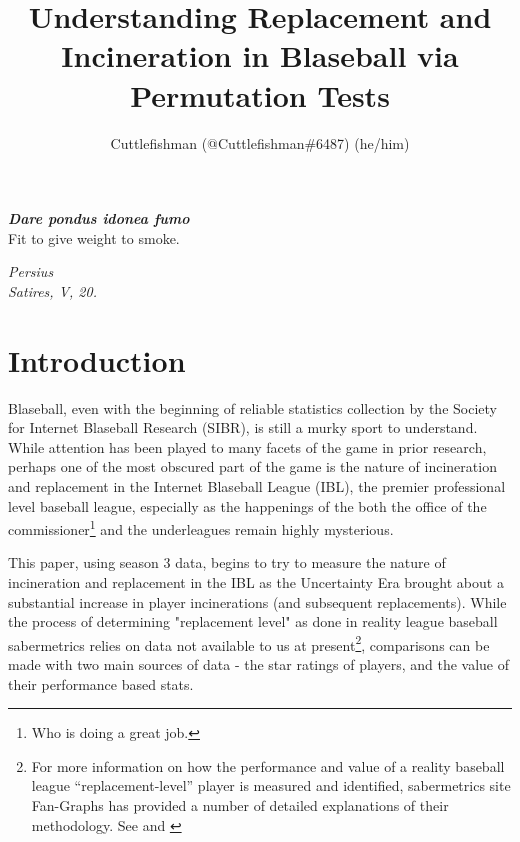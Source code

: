 \documentclass[9pt,twocolumn,twoside,a4]{sibrjnl}
\title{Understanding Replacement and Incineration in Blaseball via Permutation Tests}
\author[$\ast$]{Cuttlefishman (@Cuttlefishman\#6487) (he/him)}
\affil[$\ast$]{Society for Internet Blaseball Research}
\begin{document}
\maketitle
\thispagestyle{firststyle}
\logomark
\articletypemark
\marginmark
\firstpagefootnote



\vspace{-30pt}

\setcounter{footnote}{0} 


\epigraph{\textbf{\textit{Dare pondus idonea fumo}}\\ Fit to give weight to smoke.}{\textit{Persius \\ Satires, V, 20.}}

\section{Introduction}
Blaseball, even with the beginning of reliable statistics collection by the Society for Internet Blaseball Research ({\small{SIBR}}), is still a murky sport to understand.  While attention has been played to many facets of the game in prior research, perhaps one of the most obscured part of the game is the nature of incineration and replacement in the Internet Blaseball League ({\small{IBL}}), the premier professional level baseball league, especially as the happenings of the both the office of the commissioner\footnote{ Who is doing a great job.} and the underleagues remain highly mysterious. 

This  paper,  using  season  3  data,  begins to try  to  measure the nature of incineration and replacement in the {\small{IBL}} as the Uncertainty Era brought about a substantial increase in player incinerations (and subsequent replacements). While the process of determining "replacement level" as done in reality league baseball sabermetrics relies on data not available to us at present\footnote{For more information on how the performance and value of a reality baseball league “replacement-level” player is measured and identified, sabermetrics site Fan-Graphs has provided a number of detailed explanations of their methodology. See \citep{Slowinski2010} and \citep{Cameron2013}}, comparisons can be made with two main sources of data - the star ratings of players, and the value of their performance based stats.
\end{document}
